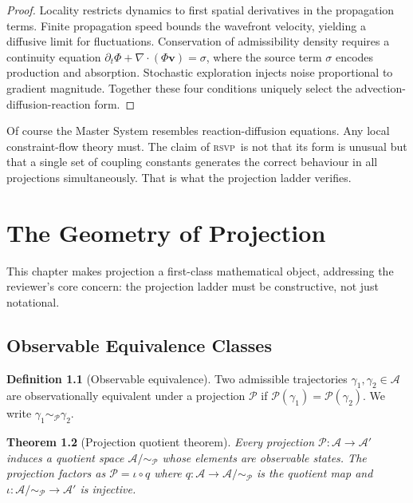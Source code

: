 \documentclass[12pt, oneside]{book}
\theoremstyle{plain}
\newtheorem{theorem}{Theorem}[chapter]
\theoremstyle{definition}
\newtheorem{definition}[theorem]{Definition}
\newcommand{\vfield}{\mathbf{v}}
\newcommand{\RSVP}{\textsc{rsvp}}
\newcommand{\nab}{\nabla}
\newcommand{\Adm}{\mathcal{A}}
\begin{document}
\begin{proof}
Locality restricts dynamics to first spatial derivatives in the propagation terms.
Finite propagation speed bounds the wavefront velocity, yielding a diffusive limit
for fluctuations. Conservation of admissibility density requires a continuity
equation $\partial_t\Phi + \nab\cdot(\Phi\vfield) = \sigma$, where the source term
$\sigma$ encodes production and absorption. Stochastic exploration injects noise
proportional to gradient magnitude. Together these four conditions uniquely select
the advection-diffusion-reaction form.
\end{proof}

Of course the Master System resembles reaction-diffusion equations. Any local
constraint-flow theory must. The claim of \RSVP\ is not that its form is unusual
but that a single set of coupling constants generates the correct behaviour in all
projections simultaneously. That is what the projection ladder verifies.

\chapter{The Geometry of Projection}
\label{ch:projection-geo}

This chapter makes projection a first-class mathematical object, addressing the
reviewer's core concern: the projection ladder must be constructive, not just
notational.

\section{Observable Equivalence Classes}
\label{sec:obs-equiv}

\begin{definition}[Observable equivalence]
\label{def:obs-equiv}
Two admissible trajectories $\gamma_1, \gamma_2 \in \Adm$ are observationally
equivalent under a projection $\mathcal{P}$ if
$\mathcal{P}(\gamma_1) = \mathcal{P}(\gamma_2)$.
We write $\gamma_1 \sim_{\mathcal{P}} \gamma_2$.
\end{definition}

\begin{theorem}[Projection quotient theorem]
\label{thm:quotient}
Every projection $\mathcal{P}: \Adm \to \Adm'$ induces a quotient space
$\Adm/{\sim_{\mathcal{P}}}$ whose elements are observable states. The projection
factors as $\mathcal{P} = \iota \circ q$ where $q: \Adm \to \Adm/{\sim_{\mathcal{P}}}$
is the quotient map and $\iota: \Adm/{\sim_{\mathcal{P}}} \to \Adm'$ is injective.
\end{theorem}
\end{document}
